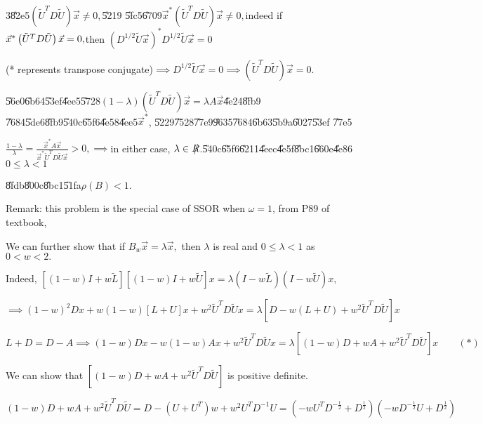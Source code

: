 \documentclass{article}
\begin{document}
3\U{82e5}$\left( \tilde{U}^{T}D\tilde{U}\right) \vec{x}\neq 0,$\U{5219}%
\U{5fc5}\U{6709}$\vec{x}^{\ast }\left( \tilde{U}^{T}D\tilde{U}\right) \vec{x}%
\neq 0,$indeed if $\vec{x}^{\ast }\left( \tilde{U}^{T}D\tilde{U}\right) \vec{%
x}=0,$then $\left( D^{1/2}\tilde{U}\vec{x}\right) ^{\ast }D^{1/2}\tilde{U}%
\vec{x}=0$

(* represents transpose conjugate)$\implies D^{1/2}\tilde{U}\vec{x}%
=0\implies \left( \tilde{U}^{T}D\tilde{U}\right) \vec{x}=0.$

\U{56e0}\U{6b64}\U{53ef}\U{4ee5}\U{5728}$\left( 1-\lambda \right) \left( 
\tilde{U}^{T}D\tilde{U}\right) \vec{x}=\lambda A\vec{x}$\U{4e24}\U{8fb9}%
\U{7684}\U{5de6}\U{8fb9}\U{540c}\U{65f6}\U{4e58}\U{4ee5}$\vec{x}^{\ast }$,%
\U{5229}\U{7528}\U{77e9}\U{9635}\U{7684}\U{6b63}\U{5b9a}\U{6027}\U{53ef}%
\U{77e5}

$\frac{1-\lambda }{\lambda }=\frac{\vec{x}^{\ast }A\vec{x}}{\vec{x}^{\ast }%
\tilde{U}^{T}D\tilde{U}\vec{x}}>0,\implies $in either case, $\lambda \in \NEG%
{R}$.\U{540c}\U{65f6}\U{6211}\U{4eec}\U{4e5f}\U{8bc1}\U{660e}\U{4e86}$0\leq
\lambda <1$

\U{8fdb}\U{800c}\U{8bc1}\U{51fa}$\rho \left( B\right) <1.$

Remark: this problem is the special case of SSOR when $\omega =1$, from P89
of textbook,

We can further show that if $B_{w}\vec{x}=\lambda \vec{x},$ then $\lambda $
is real and $0\leq \lambda <1$ as $0<w<2.$

Indeed, $\left[ \left( 1-w\right) I+w\tilde{L}\right] \left[ \left(
1-w\right) I+w\tilde{U}\right] x=\lambda \left( I-w\tilde{L}\right) \left(
I-w\tilde{U}\right) x,$

$\implies \left( 1-w\right) ^{2}Dx+w\left( 1-w\right) \left[ L+U\right]
x+w^{2}\tilde{U}^{T}D\tilde{U}x=\lambda \left[ D-w\left( L+U\right) +w^{2}%
\tilde{U}^{T}D\tilde{U}\right] x$

$L+D=D-A\implies \left( 1-w\right) Dx-w\left( 1-w\right) Ax+w^{2}\tilde{U}%
^{T}D\tilde{U}x=\lambda \left[ \left( 1-w\right) D+wA+w^{2}\tilde{U}^{T}D%
\tilde{U}\right] x\qquad \left( \ast \right) $

We can show that $\left[ \left( 1-w\right) D+wA+w^{2}\tilde{U}^{T}D\tilde{U}%
\right] $ is positive definite. 

\bigskip $\left( 1-w\right) D+wA+w^{2}\tilde{U}^{T}D\tilde{U}=D-\left(
U+U^{T}\right) w+w^{2}U^{T}D^{-1}U=\left( -wU^{T}D^{-\frac{1}{2}}+D^{\frac{1%
}{2}}\right) \left( -wD^{-\frac{1}{2}}U+D^{\frac{1}{2}}\right) $
\end{document}
